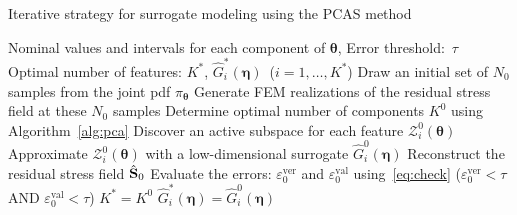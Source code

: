 \begin{breakablealgorithm}
\renewcommand{\algorithmicrequire}{\textbf{Input:}}
\renewcommand{\algorithmicensure}{\textbf{Output:}}
  \caption{Iterative strategy for surrogate modeling using the PCAS method}
  \begin{algorithmic}[1]
  \Require Nominal values and intervals for each component of $\bm{\theta}$, Error threshold:~$\tau$
  \Ensure Optimal number of features: $K^\ast$, $\hat{G}_i^\ast(\bm{\eta})$~($i=1,\ldots,K^\ast$)
    \State Draw an initial set of $N_0$ samples from the joint pdf $\pi_{\bm{\theta}}$
    \State Generate FEM realizations of the residual stress field at these $N_0$ samples
    \State Determine optimal number of components $K^0$ using Algorithm~\ref{alg:pca}
    \State Discover an active subspace for each feature $\mathcal{Z}_i^0(\bm{\theta})$
    \State Approximate $\mathcal{Z}_i^0(\bm{\theta})$ with a low-dimensional surrogate $\hat{G}_i^0(\bm{\eta})$ 
    \State Reconstruct the residual stress field $\hat{\mathbf{{S}}}_0$
    \State Evaluate the errors: $\varepsilon_0^{\text{ver}}$ and $\varepsilon_0^{\text{val}}$ using~\eqref{eq:check}
    \State \If ($\varepsilon_0^{\text{ver}}<\tau$ AND $\varepsilon_0^{\text{val}}<\tau$)
    \State $K^\ast=K^0$
    \State $\hat{G}_i^\ast(\bm{\eta})=\hat{G}_i^0(\bm{\eta})$
    \EndIf
  \EndProcedure
  \end{algorithmic}
  \label{alg:pcas}
\end{breakablealgorithm} 

